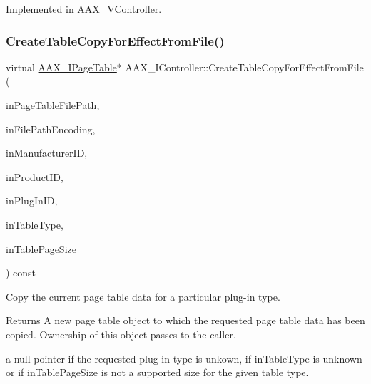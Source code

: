 Implemented in \mbox{\hyperlink{a01905_a997e7aecbf23facf4768affabed1e6fe}{A\+A\+X\+\_\+\+V\+Controller}}.

\mbox{\label{a01789_aad15c4d6b9943cdd9a5143622524eb1e}} 
\subsubsection{\texorpdfstring{CreateTableCopyForEffectFromFile()}{CreateTableCopyForEffectFromFile()}}
{\footnotesize\ttfamily virtual \mbox{\hyperlink{a01849}{A\+A\+X\+\_\+\+I\+Page\+Table}}$\ast$ A\+A\+X\+\_\+\+I\+Controller\+::\+Create\+Table\+Copy\+For\+Effect\+From\+File (\begin{DoxyParamCaption}\item[{const char $\ast$}]{in\+Page\+Table\+File\+Path,  }\item[{\mbox{\hyperlink{a00491_a8152e57310850693e4e7f00fc4922d74}{A\+A\+X\+\_\+\+E\+Text\+Encoding}}}]{in\+File\+Path\+Encoding,  }\item[{\mbox{\hyperlink{a00392_ab247c0d8686c14e05cbb567ef276f249}{A\+A\+X\+\_\+\+C\+Property\+Value}}}]{in\+Manufacturer\+ID,  }\item[{\mbox{\hyperlink{a00392_ab247c0d8686c14e05cbb567ef276f249}{A\+A\+X\+\_\+\+C\+Property\+Value}}}]{in\+Product\+ID,  }\item[{\mbox{\hyperlink{a00392_ab247c0d8686c14e05cbb567ef276f249}{A\+A\+X\+\_\+\+C\+Property\+Value}}}]{in\+Plug\+In\+ID,  }\item[{uint32\+\_\+t}]{in\+Table\+Type,  }\item[{int32\+\_\+t}]{in\+Table\+Page\+Size }\end{DoxyParamCaption}) const\hspace{0.3cm}{\ttfamily [pure virtual]}}



Copy the current page table data for a particular plug-\/in type. 

\begin{DoxyReturn}{Returns}
A new page table object to which the requested page table data has been copied. Ownership of this object passes to the caller.

a null pointer if the requested plug-\/in type is unkown, if {\ttfamily in\+Table\+Type} is unknown or if {\ttfamily in\+Table\+Page\+Size} is not a supported size for the given table type.
\end{DoxyReturn}

